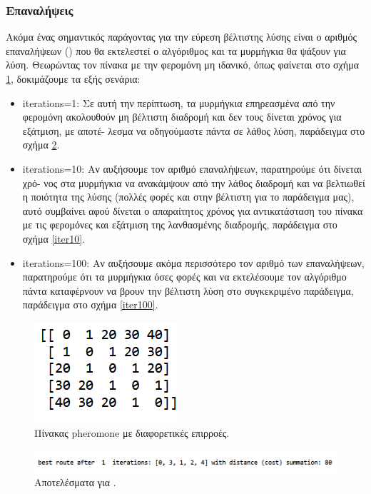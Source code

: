 \subsubsection{Επαναλήψεις}
Ακόμα ένας σημαντικός παράγοντας για την εύρεση βέλτιστης λύσης είναι ο αριθμός επαναλήψεων () που θα εκτελεστεί ο αλγόριθμος και τα μυρμήγκια θα ψάξουν για λύση. Θεωρώντας τον πίνακα με την φερομόνη μη ιδανικό, όπως φαίνεται στο σχήμα \ref{pher2}, δοκιμάζουμε τα εξής σενάρια:
\begin{itemize}
    \item iterations=1:
    Σε αυτή την περίπτωση, τα μυρμήγκια επηρεασμένα από την φερομόνη ακολουθούν μη βέλτιστη διαδρομή και δεν τους δίνεται χρόνος για εξάτμιση, με αποτέ- λεσμα να οδηγούμαστε πάντα σε λάθος λύση, παράδειγμα στο σχήμα \ref{iter1}.
    \item iterations=10:
    Αν αυξήσουμε τον αριθμό επαναλήψεων, παρατηρούμε ότι δίνεται χρό- νος στα μυρμήγκια να ανακάμψουν από την λάθος διαδρομή και να βελτιωθεί η ποιότητα της λύσης (πολλές φορές και στην βέλτιστη για το παράδειγμα μας), αυτό συμβαίνει αφού δίνεται ο απαραίτητος χρόνος για αντικατάσταση του πίνακα με τις φερομόνες και εξάτμιση της λανθασμένης διαδρομής, παράδειγμα στο σχήμα \ref{iter10}.
    \item iterations=100:
    Αν αυξήσουμε ακόμα περισσότερο τον αριθμό των επαναλήψεων, παρατηρούμε ότι τα μυρμήγκια όσες φορές και να εκτελέσουμε τον αλγόριθμο πάντα καταφέρνουν να βρουν την βέλτιστη λύση στο συγκεκριμένο παράδειγμα, παράδειγμα στο σχήμα \ref{iter100}.
\end{itemize}
\begin{figure}
    \centering
    \includegraphics[scale=1]{2947_thesis/pictures/pheromone2.png} 
    \caption{Πίνακας pheromone με διαφορετικές επιρροές.}
    \label{pher2}
\end{figure}
\begin{figure}
    \centering
    \includegraphics[scale=0.60]{2947_thesis/pictures/ex4.png} 
    \caption{Αποτελέσματα για .}
    \label{iter1}
\end{figure}
